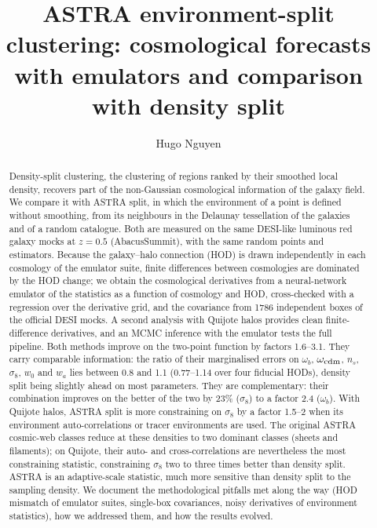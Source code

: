 \documentclass[11pt,twocolumn]{article}
\title{ASTRA environment-split clustering: cosmological forecasts with emulators and comparison with density split}
\author{Hugo Nguyen}
\date{}
\begin{document}
\maketitle

\begin{abstract}
Density-split clustering, the clustering of regions ranked by their smoothed local density, recovers part of the non-Gaussian cosmological information of the galaxy field. We compare it with ASTRA split, in which the environment of a point is defined without smoothing, from its neighbours in the Delaunay tessellation of the galaxies and of a random catalogue. Both are measured on the same DESI-like luminous red galaxy mocks at $z=0.5$ (AbacusSummit), with the same random points and estimators. Because the galaxy--halo connection (HOD) is drawn independently in each cosmology of the emulator suite, finite differences between cosmologies are dominated by the HOD change; we obtain the cosmological derivatives from a neural-network emulator of the statistics as a function of cosmology and HOD, cross-checked with a regression over the derivative grid, and the covariance from 1786 independent boxes of the official DESI mocks. A second analysis with Quijote halos provides clean finite-difference derivatives, and an MCMC inference with the emulator tests the full pipeline. Both methods improve on the two-point function by factors 1.6--3.1. They carry comparable information: the ratio of their marginalised errors on $\omega_b$, $\omega_{\rm cdm}$, $n_s$, $\sigma_8$, $w_0$ and $w_a$ lies between 0.8 and 1.1 (0.77--1.14 over four fiducial HODs), density split being slightly ahead on most parameters. They are complementary: their combination improves on the better of the two by 23\% ($\sigma_8$) to a factor 2.4 ($\omega_b$). With Quijote halos, ASTRA split is more constraining on $\sigma_8$ by a factor 1.5--2 when its environment auto-correlations or tracer environments are used. The original ASTRA cosmic-web classes reduce at these densities to two dominant classes (sheets and filaments); on Quijote, their auto- and cross-correlations are nevertheless the most constraining statistic, constraining $\sigma_8$ two to three times better than density split. ASTRA is an adaptive-scale statistic, much more sensitive than density split to the sampling density. We document the methodological pitfalls met along the way (HOD mismatch of emulator suites, single-box covariances, noisy derivatives of environment statistics), how we addressed them, and how the results evolved.
\end{abstract}
\end{document}
